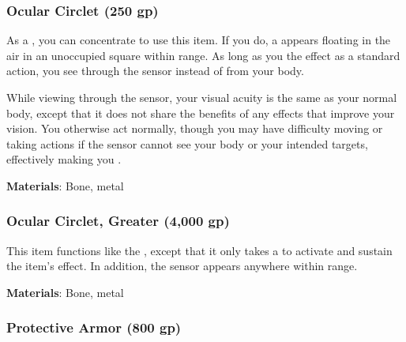 \lowercase{\hypertarget{item:Ocular Circlet}{}}\label{item:Ocular Circlet}
\hypertarget{item:Ocular Circlet}{\subsubsection{Ocular Circlet\hfill{} (250 gp)}}

As a , you can concentrate to use this item.
If you do, a  appears floating in the air in an unoccupied square within \rngclose range.
As long as you  the effect as a standard action, you see through the sensor instead of from your body.

While viewing through the sensor, your visual acuity is the same as your normal body,
except that it does not share the benefits of any  effects that improve your vision.
You otherwise act normally, though you may have difficulty moving or taking actions if the sensor cannot see your body or your intended targets, effectively making you \blinded.



\vspace{0.25em}
\textbf{Materials}: Bone, metal


\lowercase{\hypertarget{item:Ocular Circlet, Greater}{}}\label{item:Ocular Circlet, Greater}
\hypertarget{item:Ocular Circlet, Greater}{\subsubsection{Ocular Circlet, Greater\hfill{} (4,000 gp)}}

This item functions like the , except that it only takes a  to activate and sustain the item's effect.
In addition, the sensor appears anywhere within \rngmed range.



\vspace{0.25em}
\textbf{Materials}: Bone, metal


\lowercase{\hypertarget{item:Protective Armor}{}}\label{item:Protective Armor}
\hypertarget{item:Protective Armor}{\subsubsection{Protective Armor\hfill{} (800 gp)}}

